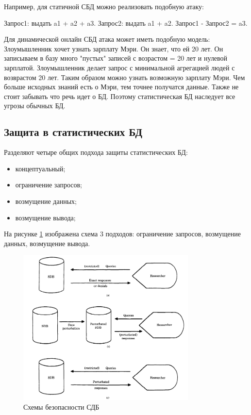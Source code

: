 Например, для статичной СБД можно реализовать подобную атаку:

Запрос1: выдать a1 + a2 + a3. Запрос2: выдать a1 + a2. Запрос1 - Запрос2 = a3.

Для динамической онлайн СБД атака может иметь подобную модель:
Злоумышленник хочет узнать зарплату Мэри. Он знает, что ей 20 лет. Он записываем в базу много "пустых" записей с возрастом = 20 лет и нулевой зарплатой. Злоумышленник делает запрос с минимальной агрегацией людей с возврастом 20 лет. Таким образом можно узнать возможную зарплату Мэри. Чем больше исходных знаний есть о Мэри, тем точнее получатся данные.
Также не стоит забывать что речь идет о БД. Поэтому статистическая БД наследует все угрозы обычных БД.

  \subsection{Защита в статистических БД}

Разделяют четыре общих подхода защиты статистических БД:
\begin{itemize}
  \item концептуальный;
	\item ограничение запросов;
	\item возмущение данных;
	\item возмущение вывода;
\end{itemize}
На рисунке \ref{fig:SDB_secure} изображена схема 3 подходов: ограничение запросов, возмущение данных, возмущение вывода.
\begin{figure}[h]
    \centering
    \includegraphics[width=0.8\textwidth]{assets/SDB_secure_method.png}
    \caption{Схемы безопасности СДБ}
    \label{fig:SDB_secure}
\end{figure}
